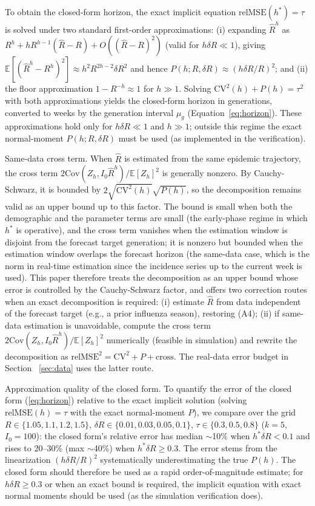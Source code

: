 \documentclass[review]{elsarticle}
\theoremstyle{plain}
\theoremstyle{definition}
\begin{document}
To obtain the closed-form horizon, the exact implicit equation $\text{relMSE}(h^*) = \tau$ is solved under two standard first-order approximations: (i) expanding $\hat{R}^h$ as $R^h + h R^{h-1}(\hat{R} - R) + O((\hat{R}-R)^2)$ (valid for $h\delta R \ll 1$), giving $\mathbb{E}[(\hat{R}^h - R^h)^2] \approx h^2 R^{2h-2}\delta R^2$ and hence $P(h; R, \delta R) \approx (h\delta R/R)^2$; and (ii) the floor approximation $1 - R^{-h} \approx 1$ for $h \gg 1$. Solving $\text{CV}^2(h) + P(h) = \tau^2$ with both approximations yields the closed-form horizon in generations, converted to weeks by the generation interval $\mu_g$ (Equation~\ref{eq:horizon}). These approximations hold only for $h\delta R \ll 1$ and $h \gg 1$; outside this regime the exact normal-moment $P(h; R, \delta R)$ must be used (as implemented in the verification).

Same-data cross term. When $\hat{R}$ is estimated from the same epidemic trajectory, the cross term $2\text{Cov}(Z_h, I_0\hat{R}^h)/\mathbb{E}[Z_h]^2$ is generally nonzero. By Cauchy-Schwarz, it is bounded by $2\sqrt{\text{CV}^2(h)}\sqrt{P(h)}$, so the decomposition remains valid as an upper bound up to this factor. The bound is small when both the demographic and the parameter terms are small (the early-phase regime in which $h^*$ is operative), and the cross term vanishes when the estimation window is disjoint from the forecast target generation; it is nonzero but bounded when the estimation window overlaps the forecast horizon (the same-data case, which is the norm in real-time estimation \citep{abbott2020epinow2, cori2013framework} since the incidence series up to the current week is used). This paper therefore treats the decomposition as an upper bound whose error is controlled by the Cauchy-Schwarz factor, and offers two correction routes when an exact decomposition is required: (i) estimate $\hat{R}$ from data independent of the forecast target (e.g., a prior influenza season), restoring (A4); (ii) if same-data estimation is unavoidable, compute the cross term $2\text{Cov}(Z_h, I_0\hat{R}^h)/\mathbb{E}[Z_h]^2$ numerically (feasible in simulation) and rewrite the decomposition as $\text{relMSE}^2 = \text{CV}^2 + P + \text{cross}$. The real-data error budget in Section~
\ref{sec:data} uses the latter route.

Approximation quality of the closed form. To quantify the error of the closed form (\ref{eq:horizon}) relative to the exact implicit solution (solving $\text{relMSE}(h)=\tau$ with the exact normal-moment $P$), we compare over the grid $R \in \{1.05, 1.1, 1.2, 1.5\}$, $\delta R \in \{0.01, 0.03, 0.05, 0.1\}$, $\tau \in \{0.3, 0.5, 0.8\}$ ($k=5$, $I_0=100$): the closed form's relative error has median $\sim$10\% when $h^*\delta R < 0.1$ and rises to 20--30\% (max $\sim$40\%) when $h^*\delta R \geq 0.3$. The error stems from the linearization $(h\delta R/R)^2$ systematically underestimating the true $P(h)$. The closed form should therefore be used as a rapid order-of-magnitude estimate; for $h\delta R \geq 0.3$ or when an exact bound is required, the implicit equation with exact normal moments should be used (as the simulation verification does).
\end{document}
